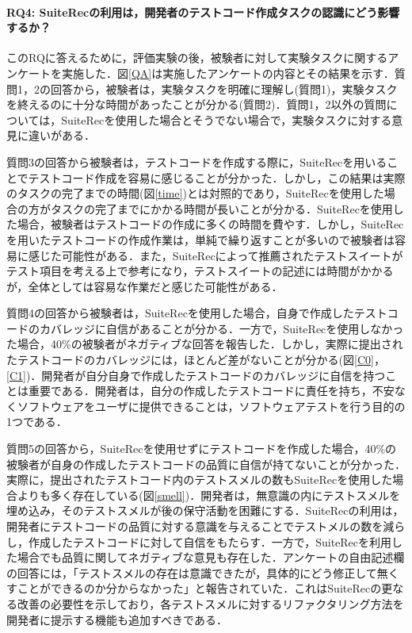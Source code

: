 \documentclass[12pt]{jarticle} %
\begin{document}
\paragraph{RQ4: {\sf SuiteRec}の利用は，開発者のテストコード作成タスクの認識にどう影響するか？}

このRQに答えるために，評価実験の後，被験者に対して実験タスクに関するアンケートを実施した．図\ref{QA}は実施したアンケートの内容とその結果を示す．質問1，2の回答から，被験者は，実験タスクを明確に理解し(質問1)，実験タスクを終えるのに十分な時間があったことが分かる(質問2)．質問1，2以外の質問については，{\sf SuiteRec}を使用した場合とそうでない場合で，実験タスクに対する意見に違いがある．

質問3の回答から被験者は，テストコードを作成する際に，{\sf SuiteRec}を用いることでテストコード作成を容易に感じることが分かった．しかし，この結果は実際のタスクの完了までの時間(図\ref{time})とは対照的であり，{\sf SuiteRec}を使用した場合の方がタスクの完了までにかかる時間が長いことが分かる．{\sf SuiteRec}を使用した場合，被験者はテストコードの作成に多くの時間を費やす．しかし，{\sf SuiteRec}を用いたテストコードの作成作業は，単純で繰り返すことが多いので被験者は容易に感じた可能性がある．また，{\sf SuiteRec}によって推薦されたテストスイートがテスト項目を考える上で参考になり，テストスイートの記述には時間がかかるが，全体としては容易な作業だと感じた可能性がある．

質問4の回答から被験者は，{\sf SuiteRec}を使用した場合，自身で作成したテストコードのカバレッジに自信があることが分かる．一方で，{\sf SuiteRec}を使用しなかった場合，40\%の被験者がネガティブな回答を報告した．しかし，実際に提出されたテストコードのカバレッジには，ほとんど差がないことが分かる(図\ref{C0}，\ref{C1})．開発者が自分自身で作成したテストコードのカバレッジに自信を持つことは重要である．開発者は，自分の作成したテストコードに責任を持ち，不安なくソフトウェアをユーザに提供できることは，ソフトウェアテストを行う目的の1つである．

質問5の回答から，{\sf SuiteRec}を使用せずにテストコードを作成した場合，40\%の被験者が自身の作成したテストコードの品質に自信が持てないことが分かった．実際に，提出されたテストコード内のテストスメルの数も{\sf SuiteRec}を使用した場合よりも多く存在している(図\ref{smell})．開発者は，無意識の内にテストスメルを埋め込み，そのテストスメルが後の保守活動を困難にする．{\sf SuiteRec}の利用は，開発者にテストコードの品質に対する意識を与えることでテストメルの数を減らし，作成したテストコードに対して自信をもたらす．一方で，{\sf SuiteRec}を利用した場合でも品質に関してネガティブな意見も存在した．アンケートの自由記述欄の回答には，「テストスメルの存在は意識できたが，具体的にどう修正して無くすことができるのか分からなかった」と報告されていた．これは{\sf SuiteRec}の更なる改善の必要性を示しており，各テストスメルに対するリファクタリング方法を開発者に提示する機能も追加すべきである．
\end{document}
